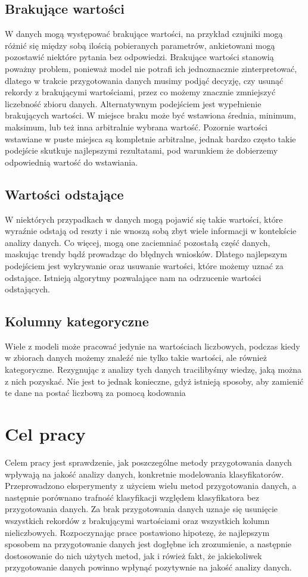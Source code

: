 \documentclass{book}
\begin{document}
\subsection{Brakujące wartości}
W danych mogą występować brakujące wartości, na przykład czujniki 
mogą różnić się między sobą ilością pobieranych parametrów, 
ankietowani mogą pozostawić niektóre pytania bez odpowiedzi. 
Brakujące wartości stanowią poważny problem, ponieważ model nie 
potrafi ich jednoznacznie zinterpretować, dlatego w trakcie 
przygotowania danych musimy podjąć decyzję, czy usunąć rekordy z 
brakującymi wartościami, przez co możemy znacznie zmniejszyć 
liczebność zbioru danych. Alternatywnym podejściem jest wypełnienie 
brakujących wartości. W miejsce braku może być wstawiona średnia, 
minimum, maksimum, lub też inna arbitralnie wybrana wartość. 
Pozornie wartości wstawiane w puste miejsca są kompletnie arbitralne, 
jednak bardzo często takie podejście skutkuje najlepszymi rezultatami, 
pod warunkiem że dobierzemy odpowiednią wartość do wstawiania. \cite{missing_values}
\subsection{Wartości odstające}
W niektórych przypadkach w danych mogą pojawić się takie wartości, 
które wyraźnie odstają od reszty i nie wnoszą sobą zbyt wiele 
informacji w kontekście analizy danych. Co więcej, mogą one 
zaciemniać pozostałą część danych, maskując trendy bądź prowadząc 
do błędnych wniosków. Dlatego najlepszym podejściem jest wykrywanie 
oraz usuwanie wartości, które możemy uznać za odstające. 
Istnieją algorytmy pozwalające nam na odrzucenie wartości odstających. \cite{outlier_detection}
\subsection{Kolumny kategoryczne}
Wiele z modeli może pracować jedynie na wartościach liczbowych, 
podczas kiedy w zbiorach danych możemy znaleźć nie tylko takie wartości, 
ale również kategoryczne. Rezygnując z analizy tych danych tracilibyśmy 
wiedzę, jaką można z nich pozyskać. Nie jest to jednak konieczne, 
gdyż istnieją sposoby, aby zamienić te dane na postać liczbową za 
pomocą kodowania \cite{enconding}

\section{Cel pracy}
Celem pracy jest sprawdzenie, jak poszczególne metody przygotowania danych
wpływają na jakość analizy danych, konkretnie modelowania klasyfikatorów. Przeprowadzono 
eksperymenty z użyciem wielu metod przygotowania danych, a następnie porównano trafność klasyfikacji 
względem klasyfikatora bez przygotowania danych. Za brak przygotowania danych uznaje się usunięcie 
wszystkich rekordów z brakującymi wartościami oraz wszystkich kolumn nieliczbowych.
Rozpoczynając prace postawiono hipotezę, że najlepszym sposobem na przygotowanie danych jest dogłębne 
ich zrozumienie, a następnie dostosowanie do nich użytych metod, jak i rówież fakt, że jakiekoliwek przygotowanie 
danych powinno wpłynąć pozytywnie na jakość analizy danych.
\end{document}
